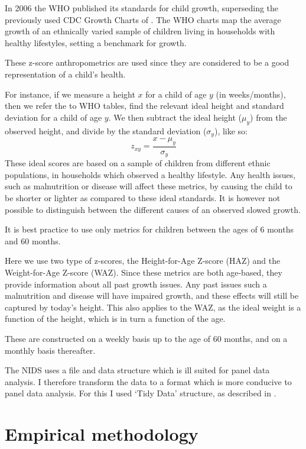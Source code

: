 \documentclass[a4paper,british]{article}\usepackage[]{graphicx}\usepackage[]{color}
\begin{document}
In 2006 the WHO published its standards for child growth\citep{who2006child},
superseding the previously used CDC Growth Charts of \citep[CDC Growth Charts: United States]{nchs2000cdc}.
The WHO charts map the average growth of an ethnically varied sample
of children living in households with healthy lifestyles, setting
a benchmark for growth.

These z-score anthropometrics are used since they are considered to
be a good representation of a child's health. 

For instance, if we measure a height $x$ for a child of age $y$
(in weeks/months), then we refer the to WHO tables, find the relevant
ideal height and standard deviation for a child of age $y$. We then
subtract the ideal height ($\mu_{y}$) from the observed height, and
divide by the standard deviation ($\sigma_{y}$), like so: 
\[
z_{xy}=\frac{x-\mu_{y}}{\sigma_{y}}
\]
These ideal scores are based on a sample of children from different
ethnic populations, in households which observed a healthy lifestyle.
Any health issues, such as malnutrition or disease will affect these
metrics, by causing the child to be shorter or lighter as compared
to these ideal standards. It is however not possible to distinguish
between the different causes of an observed slowed growth.

It is best practice to use only metrics for children between the ages
of 6 months and 60 months.

Here we use two type of z-scores, the Height-for-Age Z-score (HAZ)
and the Weight-for-Age Z-score (WAZ). Since these metrics are both
age-based, they provide information about all past growth issues.
Any past issues such a malnutrition and disease will have impaired
growth, and these effects will still be captured by today's height.
This also applies to the WAZ, as the ideal weight is a function of
the height, which is in turn a function of the age.

These are constructed on a weekly basis up to the age of 60 months,
and on a monthly basis thereafter.

The NIDS uses a file and data structure which is ill suited for panel
data analysis. I therefore transform the data to a format which is
more conducive to panel data analysis. For this I used `Tidy Data'
structure, as described in \citet{wickham2014tidy}.

\section{Empirical methodology}
\end{document}
